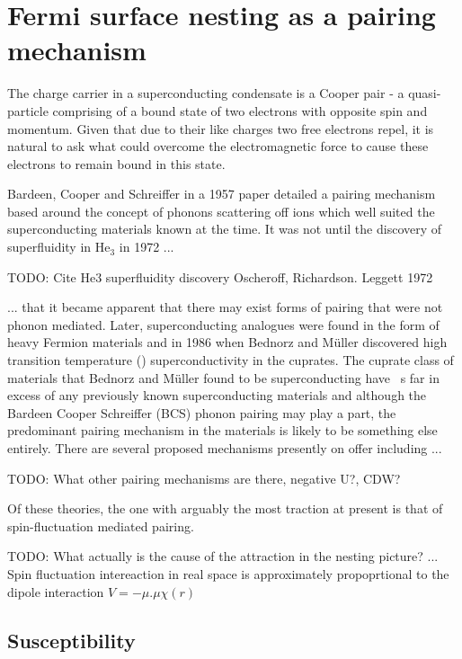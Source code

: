 

\section{Fermi surface nesting as a pairing mechanism}

The charge carrier in a superconducting condensate is a Cooper pair - a quasi-particle comprising of a bound state of two electrons with opposite spin and momentum. Given that due to their like charges two free electrons repel, it is natural to ask what could overcome the electromagnetic force to cause these electrons to remain bound in this state.

Bardeen, Cooper and Schreiffer in a 1957 paper\cite{Bardeen1957} detailed a pairing mechanism based around the concept of phonons scattering off ions which well suited the superconducting materials known at the time. It was not until the discovery of superfluidity in He$_3$ in 1972 ...

TODO: Cite He3 superfluidity discovery Oscheroff, Richardson. Leggett 1972

... that it became apparent that there may exist forms of pairing that were not phonon mediated. Later, superconducting analogues were found in the form of heavy Fermion materials and in 1986 when Bednorz and M\"uller\cite{Bednorz} discovered high transition temperature (\Tc) superconductivity in the cuprates. The cuprate class of materials that Bednorz and M\"uller found to be superconducting have \Tc~s far in excess of any previously known superconducting materials and although the Bardeen Cooper Schreiffer (BCS) phonon pairing may play a part, the predominant pairing mechanism in the \highTc materials is likely to be something else entirely\cite{Mazin2008}. There are several proposed mechanisms presently on offer including ...

TODO: What other pairing mechanisms are there, negative U?, CDW?

Of these theories, the one with arguably the most traction at present is that of spin-fluctuation mediated pairing. 

TODO: What actually is the cause of the attraction in the nesting picture? ... Spin fluctuation intereaction in real space is approximately propoprtional to the dipole interaction $V=-\mu . \mu \chi(r)$\cite{Bergemann2003} 

\subsection{Susceptibility}
    \label{Sec:1:NestingSusceptibility}

